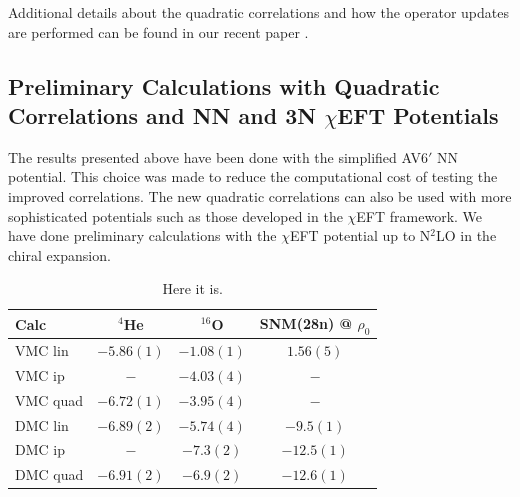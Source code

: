 Additional details about the quadratic correlations and how the operator updates are performed can be found in our recent paper \cite{lonardoni2018}.

\subsection{Preliminary Calculations with Quadratic Correlations and NN and 3N $\chi$EFT Potentials}
The results presented above have been done with the simplified AV6$'$ NN potential. This choice was made to reduce the computational cost of testing the improved correlations. The new quadratic correlations can also be used with more sophisticated potentials such as those developed in the $\chi$EFT framework. We have done preliminary calculations with the $\chi$EFT potential up to N$^2$LO in the chiral expansion.

\begin{table}[htb]
   \centering
   \begin{tabular}{lccc}
      \hline
      Calc & $^4$He & $^{16}$O & SNM(28n) @ $\rho_0$ \\
      \hline
      VMC lin  & $-5.86(1)$ & $-1.08(1)$ & $1.56(5)$ \\
      VMC ip   & $-$        & $-4.03(4)$ & $-$ \\
      VMC quad & $-6.72(1)$ & $-3.95(4)$ & $-$ \\
      \hline
      DMC lin  & $-6.89(2)$ & $-5.74(4)$ & $-9.5(1)$ \\
      DMC ip   & $-$        & $-7.3(2)$  & $-12.5(1)$ \\
      DMC quad & $-6.91(2)$ & $-6.9(2)$  & $-12.6(1)$ \\
      \hline
   \end{tabular}
   \caption{Here it is.}
\end{table}

